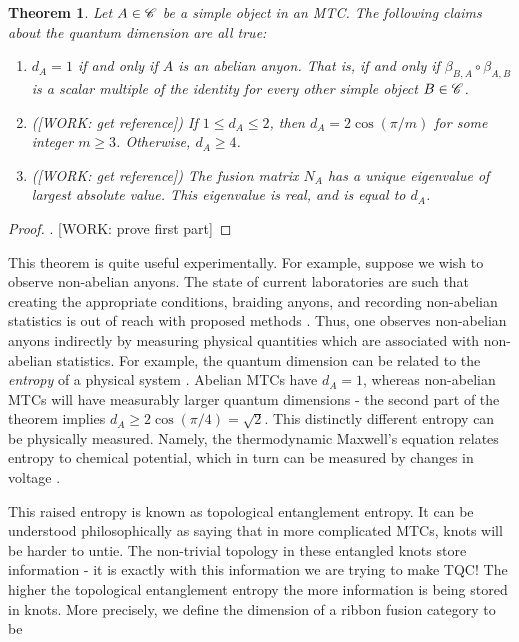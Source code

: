 \documentclass{article}
\newtheorem{theorem}{Theorem}[section]
\theoremstyle{definition}
\numberwithin{figure}{section}
\begin{document}
\begin{theorem} Let $A\in \mathscr{C}$ be a simple object in an MTC. The following claims about the quantum dimension are all true:

\begin{enumerate}

\item $d_A=1$ if and only if $A$ is an abelian anyon. That is, if and only if $\beta_{B,A}\circ \beta_{A,B}$ is a scalar multiple of the identity for every other simple object $B\in \mathscr{C}$.

\item ([WORK: get reference]) If $1\leq d_A\leq 2$, then $d_A=2\cos(\pi /m)$ for some integer $m\geq 3$. Otherwise, $d_A\geq 4$.

\item ([WORK: get reference]) The fusion matrix $N_A$ has a unique eigenvalue of largest absolute value. This eigenvalue is real, and is equal to $d_A$.
\end{enumerate}
\end{theorem}
\begin{proof}. [WORK: prove first part]
\end{proof}

This theorem is quite useful experimentally. For example, suppose we wish to observe non-abelian anyons. The state of current laboratories are such that creating the appropriate conditions, braiding anyons, and recording non-abelian statistics is out of reach with proposed methods \cite{bonderson2006probing}. Thus, one observes non-abelian anyons indirectly by measuring physical quantities which are associated with non-abelian statistics. For example, the quantum dimension can be related to the \textit{entropy} of a physical system \cite{kitaev2006topological}. Abelian MTCs have $d_A=1$, whereas non-abelian MTCs will have measurably larger quantum dimensions - the second part of the theorem implies $d_A\geq 2\cos(\pi/4)=\sqrt{2}$. This distinctly different entropy can be physically measured. Namely, the thermodynamic Maxwell's equation relates entropy to chemical potential, which in turn can be measured by changes in voltage \cite{cooper2009observable}.

This raised entropy is known as topological entanglement entropy. It can be understood philosophically as saying that in more complicated MTCs, knots will be harder to untie. The non-trivial topology in these entangled knots store information - it is exactly with this information we are trying to make TQC! The higher the topological entanglement entropy the more information is being stored in knots. More precisely, we define the dimension of a ribbon fusion category to be
\end{document}
